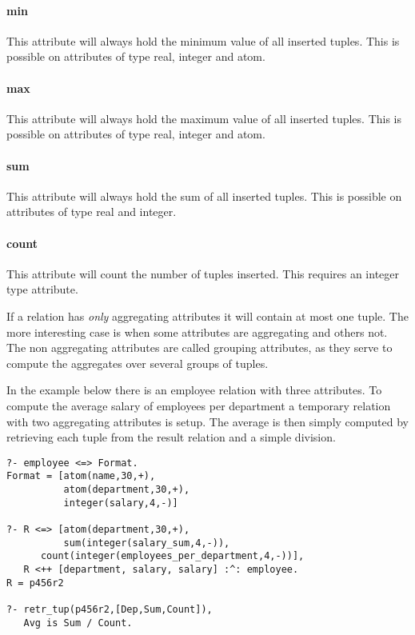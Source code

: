 \paragraph{min}
This attribute will always hold the minimum value of all inserted
tuples. This is possible on attributes of type real, integer and
atom.

\paragraph{max}
This attribute will always hold the maximum value of all inserted
tuples. This is possible on attributes of type real, integer and
atom.

\paragraph{sum}
This attribute will always hold the sum of all inserted
tuples. This is possible on attributes of type real and integer.

\paragraph{count}
This attribute will count the number of tuples inserted.
This requires an integer type attribute.


If a relation has {\em only} aggregating attributes it will
contain at most one tuple. The more interesting case is when 
some attributes are aggregating and others not. The
non aggregating attributes are called grouping attributes, as
they serve to compute the aggregates over several groups of tuples.


In the example below there is an employee relation with three attributes.
To compute the average salary of employees per department a temporary
relation with two aggregating attributes is setup.
The average is then simply computed by retrieving each tuple from
the result relation and a simple division.

\begin{verbatim}
?- employee <=> Format.
Format = [atom(name,30,+),
          atom(department,30,+),
          integer(salary,4,-)]

?- R <=> [atom(department,30,+),
          sum(integer(salary_sum,4,-)),
	  count(integer(employees_per_department,4,-))],
   R <++ [department, salary, salary] :^: employee.
R = p456r2

?- retr_tup(p456r2,[Dep,Sum,Count]),
   Avg is Sum / Count.
\end{verbatim}


